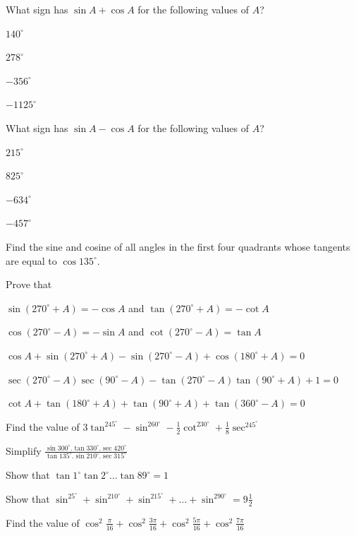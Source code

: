 What sign has $\sin A + \cos A$ for the following values of $A$?
\item $140^\circ$
\item $278^\circ$
\item $-356^\circ$
\item $-1125^\circ$
\stopitemize

What sign has $\sin A - \cos A$ for the following values of $A$?
\item $215^\circ$
\item $825^\circ$
\item $-634^\circ$
\item $-457^\circ$
\stopitemize

\item Find the sine and cosine of all angles in the first four quadrants whose tangents are equal to $\cos 135^\circ.$
\stopitemize

Prove that
\item $\sin(270^\circ + A) = -\cos A$ and $\tan(270^\circ + A) = -\cot A$
\item $\cos(270^\circ - A) = -\sin A$ and $\cot(270^\circ - A) = \tan A$
\item $\cos A + \sin(270^\circ + A) - \sin(270^\circ - A) + \cos(180^\circ + A) = 0$
\item $\sec(270^\circ - A)\sec(90^\circ - A) - \tan(270^\circ - A)\tan(90^\circ + A) + 1 = 0$
\item $\cot A + \tan(180^\circ + A) + \tan(90^\circ + A) + \tan(360^\circ - A) = 0$
\item Find the value of $3\tan^245^\circ - \sin^260^\circ - \frac{1}{2}\cot^230^\circ + \frac{1}{8}\sec^245^\circ$
\item  Simplify $\frac{\sin 300^\circ.\tan 330^\circ.\sec 420^\circ}{\tan 135^\circ.\sin 210^\circ.\sec 315^\circ}$
\item Show that $\tan 1^\circ\tan 2^\circ \ldots \tan 89^\circ = 1$
\item Show that $\sin^25^\circ + \sin^210^\circ + \sin^215^\circ + \ldots + \sin^290^\circ = 9\frac{1}{2}$
\item Find the value of $\cos^2\frac{\pi}{16} + \cos^2\frac{3\pi}{16} + \cos^2\frac{5\pi}{16} + \cos^2\frac{7\pi}{16}$
\stopitemize

